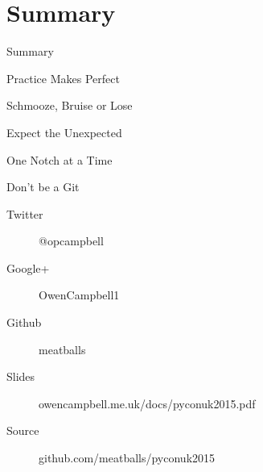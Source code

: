 \documentclass[14pt]{beamer}
\begin{document}
  \section*{Summary}
    \blankscreen{}

    \begin{frame}{Summary}
      \begin{description}
        \item Practice Makes Perfect
        \pause
        \item [Authority] Schmooze, Bruise or Lose
        \pause
        \item [Priorities] Expect the Unexpected
        \pause
        \item [Style] One Notch at a Time
        \pause
        \item [Process] Don't be a Git
      \end{description}
    \end{frame}

    \begin{frame}{}
      \begin{description}
        \item [Twitter] @opcampbell
        \item [Google+] OwenCampbell1
        \item [Github] meatballs
      \end{description}
      \vfill
      \begin{description}
        \item [Slides] {\small owencampbell.me.uk/docs/pyconuk2015.pdf}
        \item [Source] {\small github.com/meatballs/pyconuk2015}
      \end{description}
    \end{frame}
\end{document}
